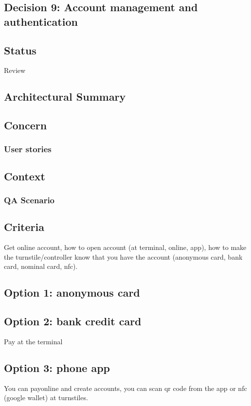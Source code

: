 \subsection{Decision 9: Account management and authentication}

\subsection*{Status}
Review
\subsection*{Architectural Summary}


\subsection*{Concern}
\subsubsection*{User stories}

\subsection*{Context}
\subsubsection*{QA Scenario} %
\subsection*{Criteria}

Get online account, how to open account (at terminal, online, app), how to make the turnstile/controller know that you have the account (anonymous card, bank card, nominal card, nfc).

\subsection*{Option 1: anonymous card}
\subsection*{Option 2: bank credit card}
Pay at the terminal
\subsection*{Option 3: phone app}
You can payonline and create accounts, you can scan qr code from the app or nfc (google wallet) at turnstiles.

